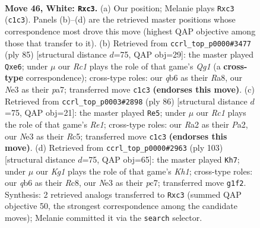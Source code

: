 \documentclass[11pt]{article}
\begin{document}
\clearpage

\begin{figure}[p]\centering
\begin{subfigure}{0.46\textwidth}\centering
\resizebox{\linewidth}{!}{%
\newchessgame
\chessboard[
  setfen={r5k1/3n4/1q1p4/1P5p/p6r/P1b1N3/R3Q3/2R3K1 w - - 0 46},
  showmover=false,
  pgfstyle=straightmove, color=movearrow, markmove={c1-c3}
]}
\caption{}
\end{subfigure}\hfill
\begin{subfigure}{0.46\textwidth}\centering
\resizebox{\linewidth}{!}{%
\newchessgame
\chessboard[
  setfen={r5qk/P1p5/2p1Q3/5r2/7P/R5P1/5n1K/4R3 b - - 4 43},
  showmover=false,
  pgfstyle=straightmove, color=movearrow, markmove={g8-e6}
]}
\caption{}
\end{subfigure}
\\[4pt]
\begin{subfigure}{0.46\textwidth}\centering
\resizebox{\linewidth}{!}{%
\newchessgame
\chessboard[
  setfen={3r2k1/q4p2/3P1P1p/2R3p1/7r/8/P2Q2P1/4R1K1 w - - 4 44},
  showmover=false,
  pgfstyle=straightmove, color=movearrow, markmove={e1-e5}
]}
\caption{}
\end{subfigure}\hfill
\begin{subfigure}{0.46\textwidth}\centering
\resizebox{\linewidth}{!}{%
\newchessgame
\chessboard[
  setfen={2r4k/2P5/q4r1p/2R5/6p1/3N1pP1/1Q3P2/6K1 b - - 4 52},
  showmover=false,
  pgfstyle=straightmove, color=movearrow, markmove={h8-h7}
]}
\caption{}
\end{subfigure}
\caption{\textbf{Move 46, White: \texttt{Rxc3}.} (a) Our position; Melanie plays \texttt{Rxc3} (\texttt{c1c3}). Panels (b)--(d) are the retrieved master positions whose correspondence most drove this move (highest QAP objective among those that transfer to it). (b) Retrieved from \texttt{ccrl\_top\_p0000\#3477} (ply 85) [structural distance $d$=75, QAP obj=29]: the master played \texttt{Qxe6}; under $\mu$ our \emph{Rc1} plays the role of that game's \emph{Qg1} (a \textbf{cross-type} correspondence); cross-type roles: our \emph{q}b6 as their \emph{R}a8, our \emph{N}e3 as their \emph{p}a7; transferred move \texttt{c1c3} \textbf{(endorses this move)}. (c) Retrieved from \texttt{ccrl\_top\_p0003\#2898} (ply 86) [structural distance $d$=75, QAP obj=21]: the master played \texttt{Re5}; under $\mu$ our \emph{Rc1} plays the role of that game's \emph{Re1}; cross-type roles: our \emph{R}a2 as their \emph{P}a2, our \emph{N}e3 as their \emph{R}c5; transferred move \texttt{c1c3} \textbf{(endorses this move)}. (d) Retrieved from \texttt{ccrl\_top\_p0000\#2963} (ply 103) [structural distance $d$=75, QAP obj=65]: the master played \texttt{Kh7}; under $\mu$ our \emph{Kg1} plays the role of that game's \emph{Kh1}; cross-type roles: our \emph{q}b6 as their \emph{R}c8, our \emph{N}e3 as their \emph{p}c7; transferred move \texttt{g1f2}. Synthesis: 2 retrieved analogs transferred to \texttt{Rxc3} (summed QAP objective 50, the strongest correspondence among the candidate moves); Melanie committed it via the \texttt{search} selector.}
\label{fig:thought-m90}
\end{figure}
\end{document}
